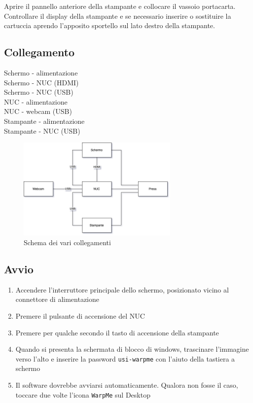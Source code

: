 \documentclass[12pt]{article}
\begin{document}
		Aprire il pannello anteriore della stampante e collocare il vassoio portacarta. Controllare il display della stampante e se necessario inserire o sostituire la cartuccia aprendo l'apposito sportello sul lato destro della stampante.
		
		
	\subsection{Collegamento}
	
		Schermo - alimentazione\\
		Schermo - NUC (HDMI)\\
		Schermo - NUC (USB)\\
		
		NUC - alimentazione\\
		NUC - webcam (USB)\\
		
		Stampante - alimentazione\\
		Stampante - NUC (USB)\\
	
		\begin{figure}[H]
                \centering
                \includegraphics[width=0.7\textwidth]{img/cables_it.png}
                \caption{Schema dei vari collegamenti}
                \label{cables}
        \end{figure}
		
		
	\subsection{Avvio}
	
	\begin{enumerate}		
		\item Accendere l'interruttore principale dello schermo, posizionato vicino al connettore di alimentazione
		\item Premere il pulsante di accensione del NUC
		\item Premere per qualche secondo il tasto di accensione della stampante
		\item Quando si presenta la schermata di blocco di windows, trascinare l'immagine verso l'alto e inserire la password \texttt{usi-warpme} con l'aiuto della tastiera a schermo
		\item Il software dovrebbe avviarsi automaticamente. Qualora non fosse il caso, toccare due volte l'icona \texttt{WarpMe} sul Desktop
	\end{enumerate}	
		
\end{document}
